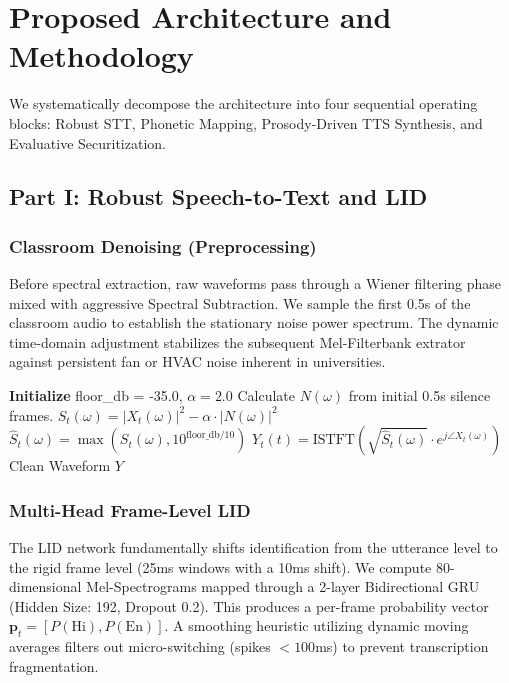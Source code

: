 \documentclass[10pt,conference]{IEEEtran}
\begin{document}
\section{Proposed Architecture and Methodology}

We systematically decompose the architecture into four sequential operating blocks: Robust STT, Phonetic Mapping, Prosody-Driven TTS Synthesis, and Evaluative Securitization.

\subsection{Part I: Robust Speech-to-Text and LID}

\subsubsection{Classroom Denoising (Preprocessing)}
Before spectral extraction, raw waveforms pass through a Wiener filtering phase mixed with aggressive Spectral Subtraction. We sample the first 0.5s of the classroom audio to establish the stationary noise power spectrum. The dynamic time-domain adjustment stabilizes the subsequent Mel-Filterbank extrator against persistent fan or HVAC noise inherent in universities.

\begin{algorithm}[H]
\caption{Spectral Subtraction Denoising}
\begin{algorithmic}[1]
\STATE \textbf{Initialize} floor\_db = -35.0, $\alpha = 2.0$
\STATE Calculate $N(\omega)$ from initial 0.5s silence frames.
    \STATE $S_t(\omega) = |X_t(\omega)|^2 - \alpha \cdot |N(\omega)|^2$
    \STATE $\hat{S}_t(\omega) = \max(S_t(\omega), 10^{\text{floor\_db}/10})$
    \STATE $Y_t(t) = \text{ISTFT}(\sqrt{\hat{S}_t(\omega)} \cdot e^{j \angle X_t(\omega)})$
\ENDFOR
\RETURN Clean Waveform $Y$
\end{algorithmic}
\end{algorithm}

\subsubsection{Multi-Head Frame-Level LID}
The LID network fundamentally shifts identification from the utterance level to the rigid frame level (25ms windows with a 10ms shift). We compute 80-dimensional Mel-Spectrograms mapped through a 2-layer Bidirectional GRU (Hidden Size: 192, Dropout 0.2). This produces a per-frame probability vector $\mathbf{p}_t = [P(\text{Hi}), P(\text{En})]$. A smoothing heuristic utilizing dynamic moving averages filters out micro-switching (spikes $<100$ms) to prevent transcription fragmentation.
\end{document}
